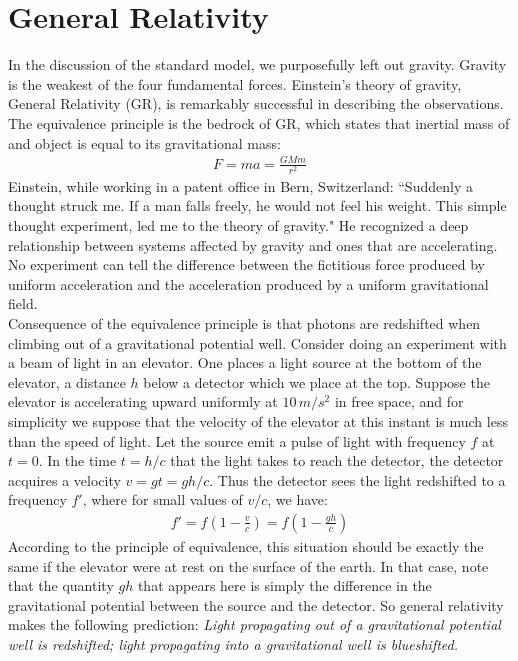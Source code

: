 \documentclass[11pt]{article}
\theoremstyle{break}
\theoremstyle{break}
\begin{document}
\newpage
\section{General Relativity}
In the discussion of the standard model, we purposefully left out gravity. Gravity is the weakest of the four fundamental forces. Einstein's theory of gravity, General Relativity (GR), is remarkably successful in describing the observations. The equivalence principle is the bedrock of GR, which states that inertial mass of and object is equal to its gravitational mass:
\begin{align*}
F = ma = \frac{GMm}{r^2}
\end{align*}
Einstein, while working in a patent office in Bern, Switzerland: ``Suddenly a thought struck me. If a man falls freely, he would not feel his weight. This simple thought experiment, led me to the theory of gravity." He recognized a deep relationship between systems affected by gravity and ones that are accelerating. No experiment can tell the difference between the fictitious force produced by uniform acceleration and the acceleration produced by a uniform gravitational field.\\

Consequence of the equivalence principle is that photons are redshifted when climbing out of a gravitational potential well. Consider doing an experiment with a beam of light in an elevator. One places a light source at the bottom of the elevator, a distance $h$ below a detector which we place at the top. Suppose the elevator is accelerating upward uniformly at $10\, m/s^2$ in free space, and for simplicity we suppose that the velocity of the elevator at this instant is much less than the speed of light. Let the source emit a pulse of light with frequency $f$ at $t = 0$. In the time $t = h/c$ that the light takes to reach the detector,
the detector acquires a velocity $ v = gt = gh/c$. Thus the detector sees the light redshifted to a frequency $f'$, where for small values of $v/c$, we have:
\begin{align*}
f' = f\left( 1-\frac{v}{c}\right) = f\left( 1 - \frac{gh}{c}\right)
\end{align*}
According to the principle of equivalence, this situation should be exactly the same if the elevator
were at rest on the surface of the earth. In that case, note that the quantity $gh$ that appears here is simply the difference in the gravitational potential between the source and the detector. So general relativity makes the following prediction: \textit{Light propagating out of a gravitational potential well is redshifted; light propagating into a gravitational well is blueshifted.}\\
\end{document}
